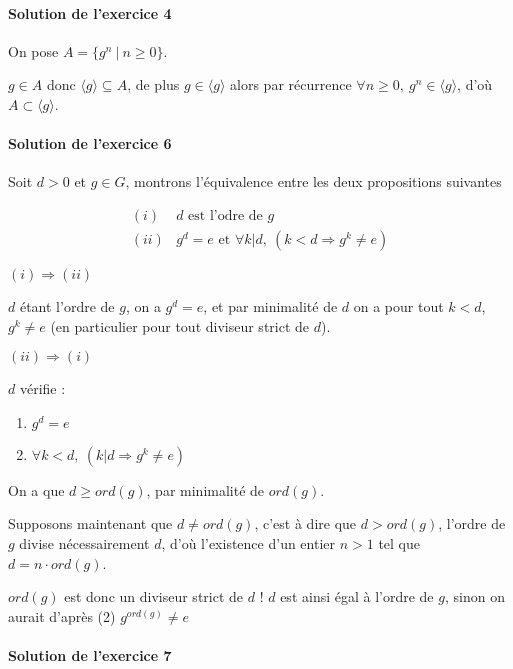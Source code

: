 \documentclass[]{article}
\theoremstyle{remark}
\theoremstyle{definition}
\newenvironment{proofpart}[1]{
	\noindent
	{\textbf{\boldmath #1}}
}{
	\checkmark
}
\begin{document}
\paragraph{Solution de l'exercice 4}
On pose $A = \{g^n ~ | ~ n \geqslant 0\}$.

$g \in A$ donc $\langle g \rangle \subseteq A$, de plus $g \in \langle g \rangle$ alors par récurrence $\forall n \geqslant 0, ~ g^n \in \langle g \rangle$, d'où $A \subset \langle g \rangle$.

\paragraph{Solution de l'exercice 6}

Soit $d > 0$ et $g \in G$, montrons l'équivalence entre les deux propositions suivantes

$$
\begin{array}{ll}
	(i) & d \text{ est l'odre de } g \\
	(ii) & g^d=e \text{ et } \forall k | d, ~ (k < d \Longrightarrow g^k \neq e)
\end{array}
$$

\noindent
\begin{proofpart}{$(i) \Longrightarrow (ii)$}

	$d$ étant l'ordre de $g$, on a $g^d=e$, et par minimalité de $d$ on a pour tout $k < d$, $g^k \neq e$ (en particulier pour tout diviseur strict de $d$).
\end{proofpart}

\begin{proofpart}{$(ii) \Longrightarrow (i)$}

	$d$ vérifie :
	\begin{enumerate}
		\item $g^d=e$
		\item $\forall k < d, ~ (k | d \Longrightarrow g^k \neq e)$
	\end{enumerate}
	
	On a que $d \geqslant ord(g)$, par minimalité de $ord(g)$.
	
	Supposons maintenant que $d \neq ord(g)$, c'est à dire que $d > ord(g)$, l'ordre de $g$ divise nécessairement $d$, d'où l'existence d'un entier $n > 1$ tel que $d= n \cdot ord(g)$.
	
	$ord(g)$ est donc un diviseur strict de $d$ ! $d$ est ainsi égal à l'ordre de $g$, sinon on aurait d'après (2) $g^{ord(g)} \neq e$
\end{proofpart}

\paragraph{Solution de l'exercice 7}
\end{document}
